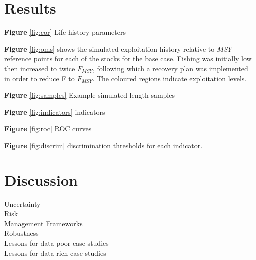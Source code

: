 \documentclass[12pt,doublespacing,a4paper]{ouparticle}
\begin{document}
\section{Results}


\textbf{Figure} \ref{fig:cor} Life history parameters

\textbf{Figure} \ref{fig:oms} shows the simulated exploitation history relative to $MSY$ reference points for each of the stocks for the base case. Fishing was initially low then increased to twice $F_{MSY}$, following which a recovery plan was implemented in order to reduce F to $F_{MSY}$. The coloured regions indicate exploitation levels.

\textbf{Figure} \ref{fig:samples} Example simulated length samples 

\textbf{Figure} \ref{fig:indicators} indicators 

\textbf{Figure} \ref{fig:roc} ROC curves

\textbf{Figure} \ref{fig:discrim} discrimination thresholds for each indicator. 



\section{Discussion}


\begin{description}
 \item[Uncertainty]  
 \item[Risk]     
 \item[Management Frameworks] 
 \item[Robustness]
 \item[Lessons for data poor case studies]  
 \item[Lessons for data rich case studies] 
\end{description}

\end{document}
